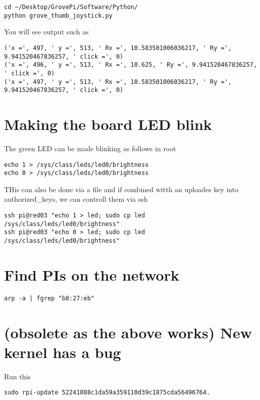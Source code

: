 \begin{lstlisting}
cd ~/Desktop/GrovePi/Software/Python/   
python grove_thumb_joystick.py
\end{lstlisting}

You will see output such as

\begin{lstlisting}
('x =', 497, ' y =', 513, ' Rx =', 10.583501006036217, ' Ry =', 9.941520467836257, ' click =', 0)
('x =', 496, ' y =', 513, ' Rx =', 10.625, ' Ry =', 9.941520467836257, ' click =', 0)
('x =', 497, ' y =', 513, ' Rx =', 10.583501006036217, ' Ry =', 9.941520467836257, ' click =', 0)
\end{lstlisting}

\section{Making the board LED blink}

The green LED can be made blinking as follows in root

\begin{lstlisting}
echo 1 > /sys/class/leds/led0/brightness
echo 0 > /sys/class/leds/led0/brightness
\end{lstlisting}

THis can also be done via a file and if combined witth an uploades key
into authorized\_keys, we can controll them via ssh

\begin{lstlisting}
ssh pi@red03 "echo 1 > led; sudo cp led /sys/class/leds/led0/brightness"        
ssh pi@red03 "echo 0 > led; sudo cp led /sys/class/leds/led0/brightness"
\end{lstlisting}

\section{Find PIs on the network}

\begin{lstlisting}
arp -a | fgrep "b8:27:eb"
\end{lstlisting}

\section{(obsolete as the above works) New kernel has a bug}

Run this

\begin{lstlisting}
sudo rpi-update 52241088c1da59a359110d39c1875cda56496764.
\end{lstlisting}

